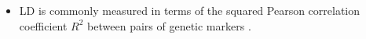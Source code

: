 \documentclass[a0paper,portrait]{baposter}
\begin{document}
\begin{poster}
{\begin{minipage}{0.3 \textwidth}
\begin{itemize}[leftmargin=*]
	\item LD is commonly measured in terms of the squared Pearson correlation coefficient $R^2$ between pairs 
		of genetic markers \citep{Hill1968}. 
\end{itemize}
\end{minipage}
}%


\end{poster}
\end{document}
